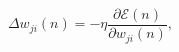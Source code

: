 \begin{equation}
\label{eq:deltaweight}
\Delta w_{ji}(n) = -\eta \frac{\partial \mathscr{E}(n)}{\partial
\mathit{w}_{ji}(n)},
\end{equation}
